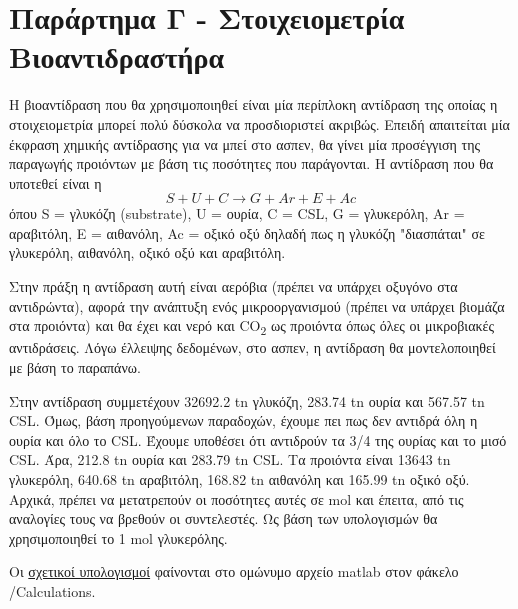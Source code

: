 \documentclass[11pt]{article}
\begin{document}
\section{Παράρτημα Γ - Στοιχειομετρία Βιοαντιδραστήρα}
\label{sec:orgd92d9e4}

Η βιοαντίδραση που θα χρησιμοποιηθεί είναι μία περίπλοκη αντίδραση της οποίας η στοιχειομετρία μπορεί πολύ δύσκολα να προσδιοριστεί ακριβώς. Επειδή απαιτείται μία έκφραση χημικής αντίδρασης για να μπεί στο ασπεν, θα γίνει μία προσέγγιση της παραγωγής προιόντων με βάση τις ποσότητες που παράγονται. Η αντίδραση που θα υποτεθεί είναι η
\[ S + U + C \rightarrow G + Ar + E + Ac\]
όπου S = γλυκόζη (substrate), U = ουρία, C = CSL, G = γλυκερόλη, Ar = αραβιτόλη, Ε = αιθανόλη, Ac = οξικό οξύ
δηλαδή πως η γλυκόζη "διασπάται" σε γλυκερόλη, αιθανόλη, οξικό οξύ και αραβιτόλη.

Στην πράξη η αντίδραση αυτή είναι αερόβια (πρέπει να υπάρχει οξυγόνο στα αντιδρώντα), αφορά την ανάπτυξη ενός μικροοργανισμού (πρέπει να υπάρχει βιομάζα στα προιόντα) και θα έχει και νερό και CO\textsubscript{2} ως προιόντα όπως όλες οι μικροβιακές αντιδράσεις. Λόγω έλλειψης δεδομένων, στο ασπεν, η αντίδραση θα μοντελοποιηθεί με βάση το παραπάνω.

Στην αντίδραση συμμετέχουν 32692.2 tn γλυκόζη, 283.74 tn ουρία και 567.57 tn CSL. Όμως, βάση προηγούμενων παραδοχών, έχουμε πει πως δεν αντιδρά όλη η ουρία και όλο το CSL. Έχουμε υποθέσει ότι αντιδρούν τα 3/4 της ουρίας και το μισό CSL. Άρα, 212.8 tn ουρία και 283.79 tn CSL. Τα προιόντα είναι 13643 tn γλυκερόλη, 640.68 tn αραβιτόλη, 168.82 tn αιθανόλη και 165.99 tn οξικό οξύ. Αρχικά, πρέπει να μετατρεπούν οι ποσότητες αυτές σε mol και έπειτα, από τις αναλογίες τους να βρεθούν οι συντελεστές. Ως βάση των υπολογισμών θα χρησιμοποιηθεί το 1 mol γλυκερόλης.

Οι \href{https://github.com/Vidianos-Giannitsis/Process-Design/blob/master/Calculations/bioreactor\_stoichiometry.m}{σχετικοί υπολογισμοί} φαίνονται στο ομώνυμο αρχείο matlab στον φάκελο /Calculations.
\end{document}
